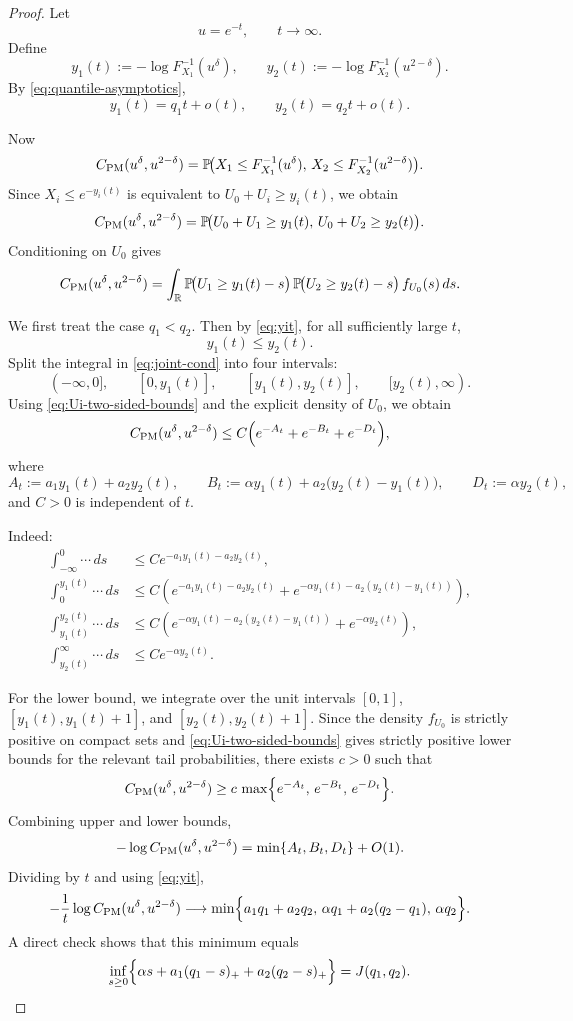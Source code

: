 \documentclass[11pt]{article}
\begin{document}
\begin{proof}
Let
\[
u=e^{-t},\qquad t\to\infty.
\]
Define
\[
y_1(t):=-\log F_{X_1}^{-1}(u^\delta),
\qquad
y_2(t):=-\log F_{X_2}^{-1}(u^{2-\delta}).
\]
By \eqref{eq:quantile-asymptotics},
\begin{equation}\label{eq:yit}
y_1(t)=q_1 t+o(t),
\qquad
y_2(t)=q_2 t+o(t).
\end{equation}

Now
\[
C_{\rm PM}(u^\delta,u^{2-\delta})
=
\mathbb P\!\bigl(X_1\le F_{X_1}^{-1}(u^\delta),\,X_2\le F_{X_2}^{-1}(u^{2-\delta})\bigr).
\]
Since $X_i\le e^{-y_i(t)}$ is equivalent to $U_0+U_i\ge y_i(t)$, we obtain
\[
C_{\rm PM}(u^\delta,u^{2-\delta})
=
\mathbb P\!\bigl(U_0+U_1\ge y_1(t),\,U_0+U_2\ge y_2(t)\bigr).
\]
Conditioning on $U_0$ gives
\begin{equation}\label{eq:joint-cond}
C_{\rm PM}(u^\delta,u^{2-\delta})
=
\int_{\mathbb R}
\mathbb P\!\bigl(U_1\ge y_1(t)-s\bigr)\,
\mathbb P\!\bigl(U_2\ge y_2(t)-s\bigr)\,
f_{U_0}(s)\,ds.
\end{equation}

We first treat the case $q_1<q_2$. Then by \eqref{eq:yit}, for all sufficiently large $t$,
\[
y_1(t)\le y_2(t).
\]
Split the integral in \eqref{eq:joint-cond} into four intervals:
\[
(-\infty,0],\qquad [0,y_1(t)],\qquad [y_1(t),y_2(t)],\qquad [y_2(t),\infty).
\]
Using \eqref{eq:Ui-two-sided-bounds} and the explicit density of $U_0$, we obtain
\[
C_{\rm PM}(u^\delta,u^{2-\delta})
\le
C\Bigl(
e^{-A_t}+e^{-B_t}+e^{-D_t}
\Bigr),
\]
where
\[
A_t:=a_1y_1(t)+a_2y_2(t),
\qquad
B_t:=\alpha y_1(t)+a_2\bigl(y_2(t)-y_1(t)\bigr),
\qquad
D_t:=\alpha y_2(t),
\]
and $C>0$ is independent of $t$.

Indeed:
\begin{align*}
\int_{-\infty}^0 \cdots\,ds
&\le C e^{-a_1 y_1(t)-a_2 y_2(t)},\\
\int_0^{y_1(t)} \cdots\,ds
&\le C\!\left(e^{-a_1 y_1(t)-a_2 y_2(t)} + e^{-\alpha y_1(t)-a_2(y_2(t)-y_1(t))}\right),\\
\int_{y_1(t)}^{y_2(t)} \cdots\,ds
&\le C\!\left(e^{-\alpha y_1(t)-a_2(y_2(t)-y_1(t))} + e^{-\alpha y_2(t)}\right),\\
\int_{y_2(t)}^\infty \cdots\,ds
&\le C e^{-\alpha y_2(t)}.
\end{align*}

For the lower bound, we integrate over the unit intervals $[0,1]$, $[y_1(t),y_1(t)+1]$, and $[y_2(t),y_2(t)+1]$. Since the density $f_{U_0}$ is strictly positive on compact sets and \eqref{eq:Ui-two-sided-bounds} gives strictly positive lower bounds for the relevant tail probabilities, there exists $c>0$ such that
\[
C_{\rm PM}(u^\delta,u^{2-\delta})
\ge
c\,
\max\Bigl\{
e^{-A_t},\,e^{-B_t},\,e^{-D_t}
\Bigr\}.
\]
Combining upper and lower bounds,
\[
-\log C_{\rm PM}(u^\delta,u^{2-\delta})
=
\min\{A_t,B_t,D_t\}+O(1).
\]
Dividing by $t$ and using \eqref{eq:yit},
\[
-\frac{1}{t}\log C_{\rm PM}(u^\delta,u^{2-\delta})
\longrightarrow
\min\Bigl\{
a_1q_1+a_2q_2,\,
\alpha q_1+a_2(q_2-q_1),\,
\alpha q_2
\Bigr\}.
\]
A direct check shows that this minimum equals
\[
\inf_{s\ge 0}\Bigl\{\alpha s+a_1(q_1-s)_+ + a_2(q_2-s)_+\Bigr\}
=
J(q_1,q_2).
\]


\end{proof}
\end{document}
